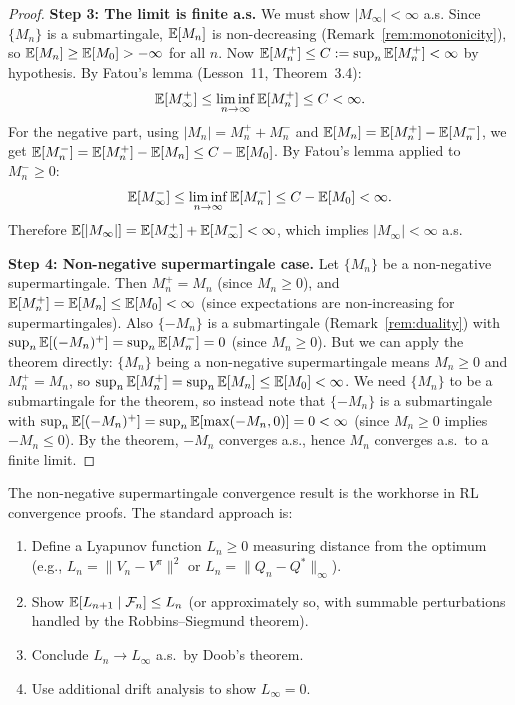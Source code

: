 \documentclass[11pt,a4paper]{article}
\begin{document}
\begin{proof}
\textbf{Step 3: The limit is finite a.s.}
We must show $|M_\infty| < \infty$ a.s.  Since $\{M_n\}$ is a
submartingale, $\mathbb{E}[M_n]$ is non-decreasing
(Remark~\ref{rem:monotonicity}), so
$\mathbb{E}[M_n] \geq \mathbb{E}[M_0] > -\infty$ for all $n$.  Now
$\mathbb{E}[M_n^+] \leq C := \sup_n \mathbb{E}[M_n^+] < \infty$ by hypothesis.
By Fatou's lemma (Lesson~11, Theorem~3.4):
\begin{equation}
  \mathbb{E}[M_\infty^+]
  \leq \liminf_{n \to \infty} \mathbb{E}[M_n^+] \leq C < \infty.
\end{equation}
For the negative part, using $|M_n| = M_n^+ + M_n^-$ and
$\mathbb{E}[M_n] = \mathbb{E}[M_n^+] - \mathbb{E}[M_n^-]$, we get
$\mathbb{E}[M_n^-] = \mathbb{E}[M_n^+] - \mathbb{E}[M_n] \leq C - \mathbb{E}[M_0]$.
By Fatou's lemma applied to $M_n^- \geq 0$:
\begin{equation}
  \mathbb{E}[M_\infty^-]
  \leq \liminf_{n \to \infty} \mathbb{E}[M_n^-]
  \leq C - \mathbb{E}[M_0] < \infty.
\end{equation}
Therefore $\mathbb{E}[|M_\infty|] = \mathbb{E}[M_\infty^+] + \mathbb{E}[M_\infty^-]
< \infty$, which implies $|M_\infty| < \infty$ a.s.

\textbf{Step 4: Non-negative supermartingale case.}
Let $\{M_n\}$ be a non-negative supermartingale.  Then
$M_n^+ = M_n$ (since $M_n \geq 0$), and
$\mathbb{E}[M_n^+] = \mathbb{E}[M_n] \leq \mathbb{E}[M_0] < \infty$ (since expectations
are non-increasing for supermartingales).  Also $\{-M_n\}$ is a
submartingale (Remark~\ref{rem:duality}) with
$\sup_n \mathbb{E}[(-M_n)^+] = \sup_n \mathbb{E}[M_n^-] = 0$ (since
$M_n \geq 0$).  But we can apply the theorem directly: $\{M_n\}$
being a non-negative supermartingale means $M_n \geq 0$ and
$M_n^+ = M_n$, so $\sup_n \mathbb{E}[M_n^+] = \sup_n \mathbb{E}[M_n] \leq
\mathbb{E}[M_0] < \infty$.  We need $\{M_n\}$ to be a submartingale for
the theorem, so instead note that $\{-M_n\}$ is a submartingale
with
$\sup_n \mathbb{E}[(-M_n)^+] = \sup_n \mathbb{E}[\max(-M_n, 0)] = 0 < \infty$
(since $M_n \geq 0$ implies $-M_n \leq 0$).  By the theorem,
$-M_n$ converges a.s., hence $M_n$ converges a.s.\ to a finite
limit.
\end{proof}

\begin{rlconnection}[title={Non-Negative Supermartingales in RL}]
The non-negative supermartingale convergence result is the
workhorse in RL convergence proofs.  The standard approach is:
\begin{enumerate}[nosep]
  \item Define a Lyapunov function $L_n \geq 0$ measuring
    distance from the optimum (e.g.,
    $L_n = \|V_n - V^\pi\|^2$ or
    $L_n = \|Q_n - Q^*\|_\infty$).
  \item Show $\mathbb{E}[L_{n+1} \mid \mathcal{F}_n] \leq L_n$ (or
    approximately so, with summable perturbations handled by
    the Robbins--Siegmund theorem).
  \item Conclude $L_n \to L_\infty$ a.s.\ by Doob's theorem.
  \item Use additional drift analysis to show
    $L_\infty = 0$.
\end{enumerate}
\end{rlconnection}
\end{document}
